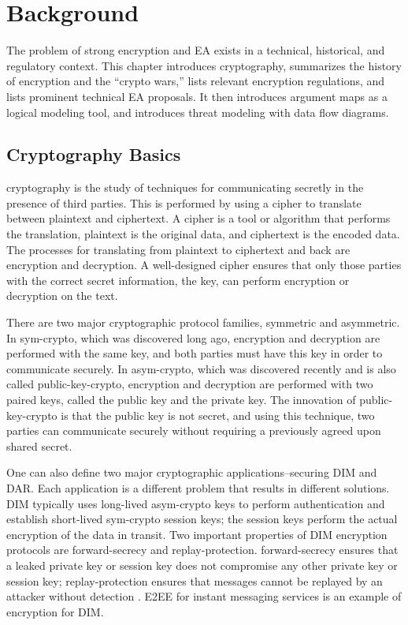 \chapter{Background}
\label{chap-background}

The problem of strong encryption and \acl{EA} exists in a technical, historical, and regulatory context. This chapter
introduces cryptography, summarizes the history of encryption and the ``crypto wars,'' lists relevant encryption
regulations, and lists prominent technical \ac{EA} proposals. It then introduces argument maps as a logical modeling
tool, and introduces threat modeling with data flow diagrams.



\section{Cryptography Basics}
\label{sec-crypto-basics}

\Ac{cryptography} is the study of techniques for communicating secretly in the presence of third parties. This is
performed by using a \ac{cipher} to translate between \ac{plaintext} and \ac{ciphertext}. A cipher is a tool or
algorithm that performs the translation, plaintext is the original data, and ciphertext is the encoded data. The
processes for translating from plaintext to ciphertext and back are \ac{encryption} and \ac{decryption}. A well-designed
cipher ensures that only those parties with the correct secret information, the \ac{key}, can perform encryption or
decryption on the text.


There are two major cryptographic protocol families, symmetric and asymmetric. In \ac{sym-crypto}, which was discovered
long ago, encryption and decryption are performed with the same key, and both parties must have this key in order to
communicate securely. In \ac{asym-crypto}, which was discovered recently and is also called \ac{public-key-crypto},
encryption and decryption are performed with two paired keys, called the public key and the private key. The innovation
of \ac{public-key-crypto} is that the public key is not secret, and using this technique, two parties can communicate
securely without requiring a previously agreed upon shared secret.

One can also define two major cryptographic applications--securing \acf{DIM} and \acf{DAR}. Each application is a
different problem that results in different solutions. \Ac{DIM} typically uses long-lived \ac{asym-crypto} keys to
perform authentication and establish short-lived \ac{sym-crypto} session keys; the session keys perform the actual
encryption of the data in transit. Two important properties of \ac{DIM} encryption protocols are \ac{forward-secrecy}
and \ac{replay-protection}. \Ac{forward-secrecy} ensures that a leaked private key or session key does not compromise
any other private key or session key; \ac{replay-protection} ensures that messages cannot be replayed by an
attacker without detection \cite{bellovin_thinking_2016}. \Ac{E2EE} for instant messaging services is an example of
encryption for \ac{DIM}.

